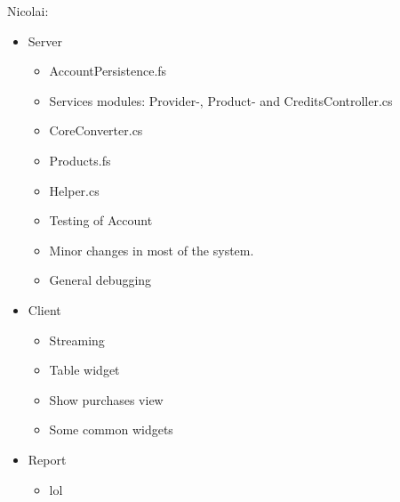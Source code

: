 Nicolai: 
\begin{itemize}
	\item Server
	\begin{itemize}
		\item AccountPersistence.fs
		\item Services modules: Provider-, Product- and CreditsController.cs
		\item CoreConverter.cs
		\item Products.fs
		\item Helper.cs
		\item Testing of Account
		\item Minor changes in most of the system.
		\item General debugging
	\end{itemize}
	\item Client
	\begin{itemize}
		\item Streaming
		\item Table widget
		\item Show purchases view
		\item Some common widgets
	\end{itemize}
	\item Report
	\begin{itemize}
		\item lol
	\end{itemize}
\end{itemize}